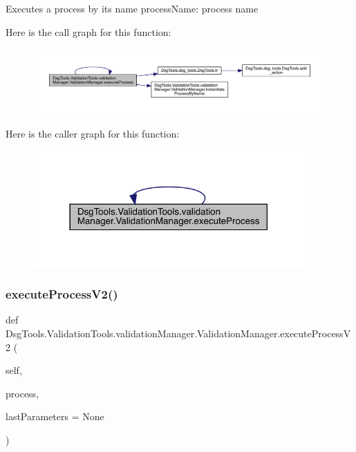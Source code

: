 \begin{DoxyVerb}Executes a process by its name
processName: process name
\end{DoxyVerb}
 Here is the call graph for this function\+:
\nopagebreak
\begin{figure}[H]
\begin{center}
\leavevmode
\includegraphics[width=350pt]{class_dsg_tools_1_1_validation_tools_1_1validation_manager_1_1_validation_manager_af0cb4ad437c9307e43d2fdf837ae6284_cgraph}
\end{center}
\end{figure}
Here is the caller graph for this function\+:
\nopagebreak
\begin{figure}[H]
\begin{center}
\leavevmode
\includegraphics[width=294pt]{class_dsg_tools_1_1_validation_tools_1_1validation_manager_1_1_validation_manager_af0cb4ad437c9307e43d2fdf837ae6284_icgraph}
\end{center}
\end{figure}
\mbox{\label{class_dsg_tools_1_1_validation_tools_1_1validation_manager_1_1_validation_manager_a2d8658908b9fd7f171aefa0dc4a617a3}} 
\subsubsection{\texorpdfstring{execute\+Process\+V2()}{executeProcessV2()}}
{\footnotesize\ttfamily def Dsg\+Tools.\+Validation\+Tools.\+validation\+Manager.\+Validation\+Manager.\+execute\+Process\+V2 (\begin{DoxyParamCaption}\item[{}]{self,  }\item[{}]{process,  }\item[{}]{last\+Parameters = {\ttfamily None} }\end{DoxyParamCaption})}

